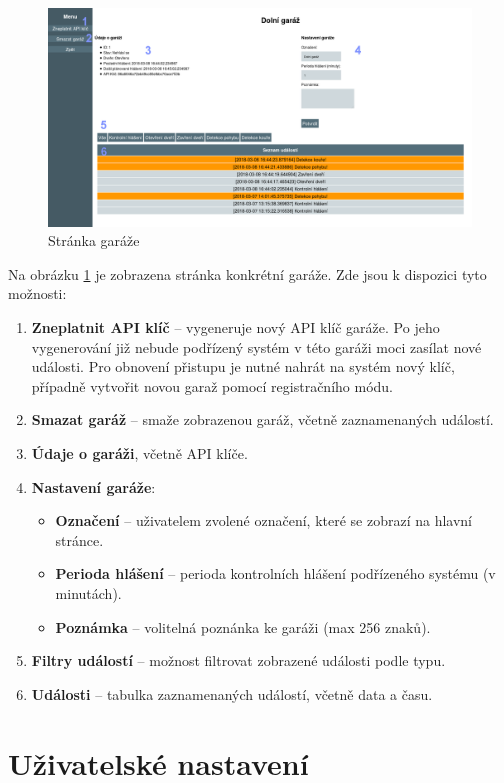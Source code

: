 \begin{figure}[h!]
    \centering
    \includegraphics[width=\textwidth]{images/garage_page.png}
    \caption[Stránka garáže]{Stránka garáže}
    \label{fig:garage_page}
\end{figure}

Na obrázku \ref{fig:garage_page} je zobrazena stránka konkrétní garáže. Zde jsou k dispozici tyto možnosti:

\begin{enumerate}
    \item \textbf{Zneplatnit API klíč} -- vygeneruje nový API klíč garáže. Po jeho vygenerování již nebude podřízený systém v této garáži moci zasílat nové události. Pro obnovení přistupu je nutné nahrát na systém nový klíč, případně vytvořit novou garaž pomocí registračního módu.
    \item \textbf{Smazat garáž} -- smaže zobrazenou garáž, včetně zaznamenaných událostí.
    \item \textbf{Údaje o garáži}, včetně API klíče.
    \item \textbf{Nastavení garáže}:
    \begin{itemize}
        \item \textbf{Označení} -- uživatelem zvolené označení, které se zobrazí na hlavní stránce.
        \item \textbf{Perioda hlášení} -- perioda kontrolních hlášení podřízeného systému (v minutách).
        \item \textbf{Poznámka} -- volitelná poznánka ke garáži (max 256 znaků).
    \end{itemize}
    \item \textbf{Filtry událostí} -- možnost filtrovat zobrazené události podle typu.
    \item \textbf{Události} -- tabulka zaznamenaných událostí, včetně data a času.
\end{enumerate}


\section{Uživatelské nastavení}
\label{sec:guide_user_settings}
